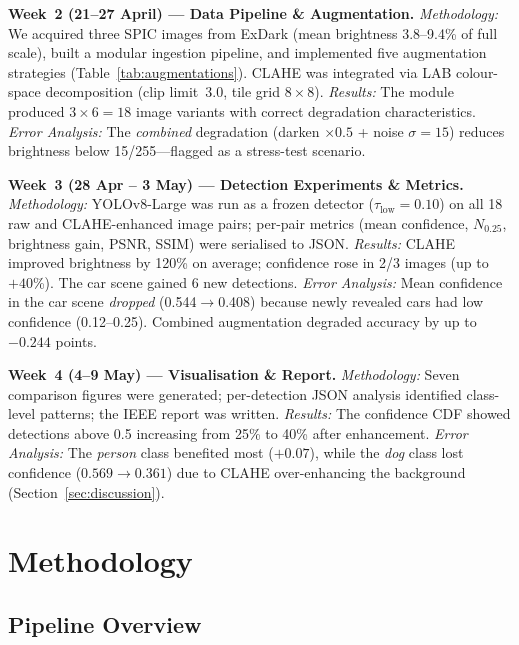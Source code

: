 \documentclass[conference]{IEEEtran}
\begin{document}
\textbf{Week~2 (21--27 April) --- Data Pipeline \& Augmentation.}
\emph{Methodology:}
We acquired three SPIC images from ExDark (mean brightness
3.8--9.4\% of full scale), built a modular ingestion pipeline, and
implemented five augmentation strategies
(Table~\ref{tab:augmentations}).  CLAHE was integrated via LAB
colour-space decomposition (clip limit~3.0, tile grid $8{\times}8$).
\emph{Results:}
The module produced $3 \times 6 = 18$ image variants with correct
degradation characteristics.
\emph{Error Analysis:}
The \emph{combined} degradation (darken $\times 0.5$ + noise
$\sigma=15$) reduces brightness below 15/255---flagged as a
stress-test scenario.

\textbf{Week~3 (28 Apr -- 3 May) --- Detection Experiments \& Metrics.}
\emph{Methodology:}
YOLOv8-Large was run as a frozen detector ($\tau_{\text{low}}=0.10$)
on all 18 raw and CLAHE-enhanced image pairs; per-pair metrics
(mean confidence, $N_{0.25}$, brightness gain, PSNR, SSIM) were
serialised to JSON.
\emph{Results:}
CLAHE improved brightness by 120\% on average; confidence rose in
2/3 images (up to $+40$\%).  The car scene gained 6 new detections.
\emph{Error Analysis:}
Mean confidence in the car scene \emph{dropped} (0.544$\to$0.408)
because newly revealed cars had low confidence (0.12--0.25).
Combined augmentation degraded accuracy by up to $-0.244$ points.

\textbf{Week~4 (4--9 May) --- Visualisation \& Report.}
\emph{Methodology:}
Seven comparison figures were generated; per-detection JSON analysis
identified class-level patterns; the IEEE report was written.
\emph{Results:}
The confidence CDF showed detections above 0.5 increasing from
25\% to 40\% after enhancement.
\emph{Error Analysis:}
The \emph{person} class benefited most ($+0.07$), while the
\emph{dog} class lost confidence ($0.569 \to 0.361$) due to CLAHE
over-enhancing the background (Section~\ref{sec:discussion}).

\section{Methodology}
\label{sec:methodology}

\subsection{Pipeline Overview}
\end{document}
